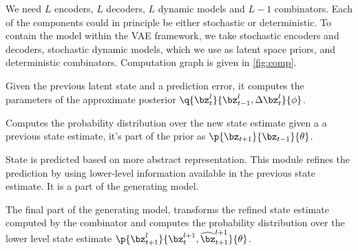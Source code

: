 \documentclass[]{article}
\begin{document}
	We need $L$ encoders, $L$ decoders, $L$ dynamic models and $L-1$ combinators. Each of the components could in principle be either stochastic or deterministic. To contain the model within the VAE framework, we take stochastic encoders and decoders, stochastic dynamic models, which we use as latent space priors, and deterministic combinators. Computation graph is given in \cref{fig:comp}.
	\begin{description}[leftmargin=\parindent]
		\item[encoder] Given the previous latent state and a prediction error, it computes the parameters of the approximate posterior $\q{\bz_t^l}{\bz_{t-1}^l, \Delta \bz_t^l}{\phi}$.
		\item[dynamic model] Computes the probability distribution over the new state estimate given a a previous state estimate, it's part of the prior as $\p{\bz_{t+1}}{\bz_{t-1}}{\theta}$.
		\item[combinator] State is predicted based on more abstract representation. This module refines the prediction by using lower-level information available in the previous state estimate. It is a part of the generating model.
		\item[decoder] The final part of the generating model, transforms the refined state estimate computed by the combinator and computes the probability distribution over the lower level state estimate $\p{\bz_{t+1}^l}{ \bz_{t}^{l+1}, \widehat{\bz}_{t+1}^{l+1} }{\theta}$.
	\end{description}
\end{document}
